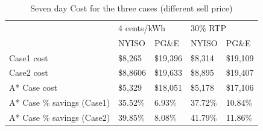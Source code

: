 

\begin{table}[htb]
\caption{Seven day Cost for the three cases (different sell price)}
\label{tab:Cost}
\centering

\begin{tabular}{l|l|l|l|l|}
\cline{2-5}
                            & \multicolumn{2}{l|}{4 cents/kWh} & \multicolumn{2}{l|}{30\% RTP}   \\ \cline{2-5} 
                            & NYISO           & PG\&E          & NYISO          & PG\&E          \\ \hline
\multicolumn{1}{|l|}{Case1 cost} & \$8,265  & \$19,396 & \$8,314 & \$19,109 \\ \hline
\multicolumn{1}{|l|}{Case2 cost} & \$8,8606  & \$19,633 & \$8,895 & \$19,407 \\ \hline
\multicolumn{1}{|l|}{A* Case cost} & \$5,329  & \$18,051 & \$5,178 & \$17,106 \\ \hline
\multicolumn{1}{|l|}{A* Case \% savings (Case1)} & 35.52\%         & 6.93\%         & 37.72\%        & 10.84\%        \\ \hline
\multicolumn{1}{|l|}{A* Case \% savings (Case2)} & 39.85\%         & 8.08\%         & 41.79\%        & 11.86\%        \\ \hline
\end{tabular}

\end{table}





